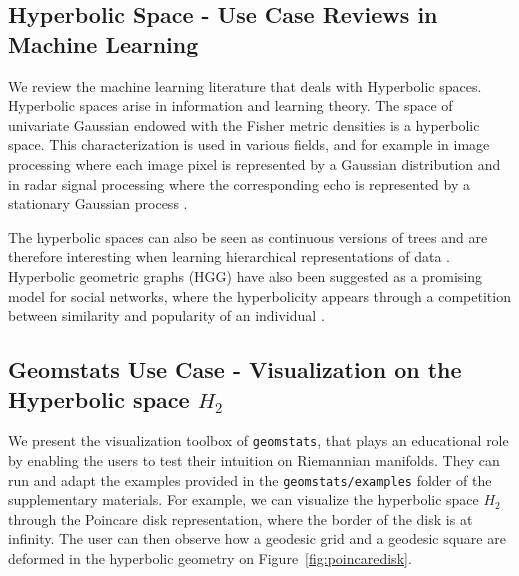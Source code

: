 \documentclass{article}
\begin{document}
\subsection{Hyperbolic Space - Use Case Reviews in Machine Learning}

We review the machine learning literature that deals with Hyperbolic spaces. Hyperbolic spaces arise in information and learning theory. The space of univariate Gaussian endowed with the Fisher metric densities is a hyperbolic space. This characterization is used in various fields, and for example in image processing where each image pixel is represented by a Gaussian distribution \cite{Angulo2014} and in radar signal processing where the corresponding echo is represented by a stationary Gaussian process \cite{Arnaudon2013}.

The hyperbolic spaces can also be seen as continuous versions of trees and are therefore interesting when learning hierarchical representations of data \cite{Nickel2017}. Hyperbolic geometric graphs (HGG) have also been suggested as a promising model for social networks, where the hyperbolicity appears through a competition between similarity and popularity of an individual \cite{Papadopoulos2012}.

\subsection{Geomstats Use Case - Visualization on the Hyperbolic space $H_2$}\label{sec:hn}

We present the visualization toolbox of \texttt{geomstats}, that plays an educational role by enabling the users to test their intuition on Riemannian manifolds. They can run and adapt the examples provided in the \texttt{geomstats/examples} folder of the supplementary materials. For example, we can visualize the hyperbolic space $H_2$ through the Poincare disk representation, where the border of the disk is at infinity. The user can then observe how a geodesic grid and a geodesic square are deformed in the hyperbolic geometry on Figure~\ref{fig:poincaredisk}.
\end{document}
